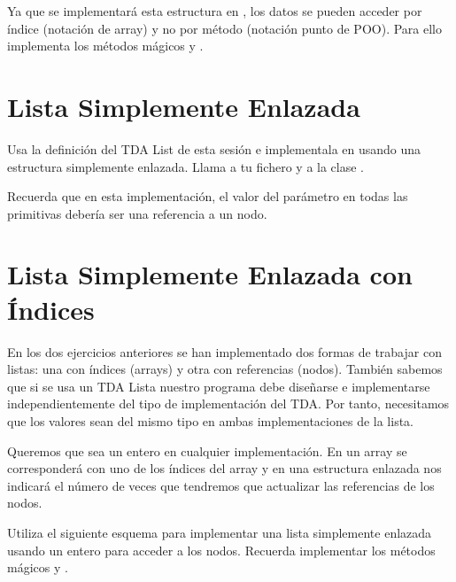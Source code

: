 Ya que se implementará esta estructura en , los datos se pueden acceder por índice (notación de array) y no por método (notación punto de POO). Para ello implementa los métodos mágicos  y .





%


\separacion
\section{Lista Simplemente Enlazada} 

Usa la definición del TDA List de esta sesión e implementala
en  usando una estructura simplemente enlazada.
Llama a tu fichero  y a la clase .


Recuerda que en esta implementación, el valor del parámetro  en todas las primitivas debería ser una referencia a un nodo.



\separacion
\section{Lista Simplemente Enlazada con Índices} \label{sec:listasimplementeenlazada}

En los dos ejercicios anteriores se han implementado dos formas de trabajar con listas: una con índices (arrays) y otra con referencias (nodos). También sabemos que si se usa un TDA Lista nuestro programa debe diseñarse e implementarse independientemente del tipo de implementación del TDA. Por tanto, necesitamos que los valores  sean del mismo tipo en ambas implementaciones de la lista. 

Queremos que  sea un entero en cualquier implementación. En un array se corresponderá con uno de los índices del array y en una estructura enlazada nos indicará el número de veces que tendremos que actualizar las referencias de los nodos.

Utiliza el siguiente esquema para implementar una lista simplemente enlazada usando un entero para acceder a los nodos. Recuerda implementar los métodos mágicos  y .


